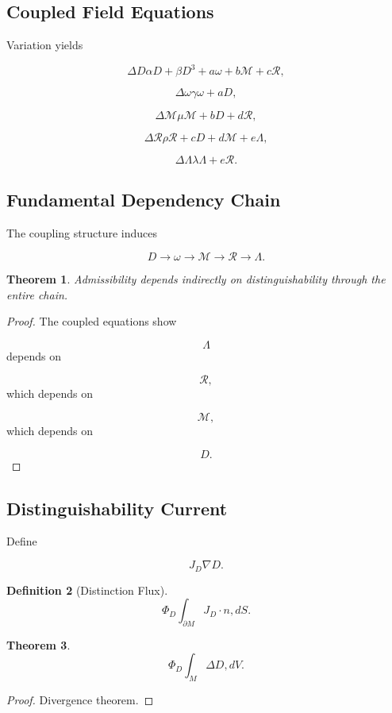 \documentclass[12pt]{article}
\newtheorem{theorem}{Theorem}[section]
\newtheorem{definition}[theorem]{Definition}
\theoremstyle{remark}
\begin{document}
\subsection{Coupled Field Equations}

Variation yields

\[
\Delta D
\alpha D
+
\beta D^3
+
a\omega
+
b\mathcal M
+
c\mathcal R,
\]

\[
\Delta\omega
\gamma\omega
+
aD,
\]

\[
\Delta\mathcal M
\mu\mathcal M
+
bD
+
d\mathcal R,
\]

\[
\Delta\mathcal R
\rho\mathcal R
+
cD
+
d\mathcal M
+
e\Lambda,
\]

\[
\Delta\Lambda
\lambda\Lambda
+
e\mathcal R.
\]

\subsection{Fundamental Dependency Chain}

The coupling structure induces

\[
D
\rightarrow
\omega
\rightarrow
\mathcal M
\rightarrow
\mathcal R
\rightarrow
\Lambda.
\]
\begin{theorem}
Admissibility depends indirectly on distinguishability through the entire chain.
\end{theorem}

\begin{proof}
The coupled equations show

\[
\Lambda
\]
depends on

\[
\mathcal R,
\]
which depends on

\[
\mathcal M,
\]
which depends on

\[
D.
\]
\end{proof}
\subsection{Distinguishability Current}

Define

\[
J_D
\nabla D.
\]

\begin{definition}[Distinction Flux]
\[
\Phi_D
\int_{\partial M}
J_D\cdot n
,dS.
\]
\end{definition}

\begin{theorem}
\[
\Phi_D
\int_M
\Delta D
,dV.
\]
\end{theorem}

\begin{proof}
Divergence theorem.
\end{proof}
\end{document}
